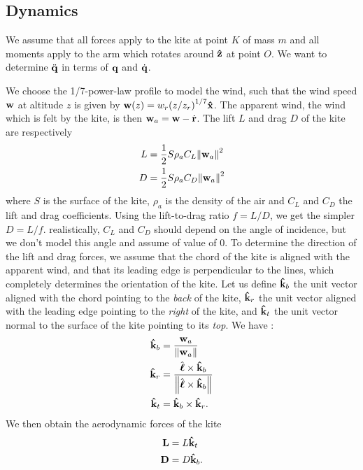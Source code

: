 \subsection{Dynamics}  \label{sec:model10D-dynamics}

We assume that all forces apply to the kite at point $K$ of mass $m$ and all moments apply to the arm which rotates around $\vu z$ at point $O$.
We want to determine $\ddot{\vb q}$ in terms of $\vb q$ and $\dot{\vb q}$.

\label{sec:model10D-dyn-aero}

We choose the 1/7-power-law profile to model the wind, such that the wind speed $\vb w$ at altitude $z$ is given by $\vb w(z) = w_r \qty( z / z_r )^{1/7} \vu x$.
The apparent wind, the wind which is felt by the kite, is then $\vb w_a = \vb w - \dot{\vb r}$.
The lift $L$ and drag $D$ of the kite are respectively
\begin{align}
    L &= \frac{1}{2} S \rho_a C_L \norm{\vb w_a}^2 \\
    D &= \frac{1}{2} S \rho_a C_D \norm{\vb w_a}^2
\end{align}
%
where $S$ is the surface of the kite, $\rho_a$ is the density of the air and $C_L$ and $C_D$ the lift and drag coefficients.
Using the lift-to-drag ratio $f = L / D$, we get the simpler $D = L/f$.
realistically, $C_L$ and $C_D$ should depend on the angle of incidence, but we don't model this angle and assume of value of $0$.
To determine the direction of the lift and drag forces, we assume that the chord of the kite is aligned with the apparent wind, and that its leading edge is perpendicular to the lines, which completely determines the orientation of the kite.
Let us define $\vu k_b$ the unit vector aligned with the chord pointing to the \emph{back} of the kite, $\vu k_r$ the unit vector aligned with the leading edge pointing to the \emph{right} of the kite, and $\vu k_t$ the unit vector normal to the surface of the kite pointing to its \emph{top}.
We have :
\begin{align}
    \vu k_b &= \frac{\vb w_a }{\norm{\vb w_a}} \\
    \vu k_r &= \frac{\hat{\boldsymbol{\ell}} \times \vu k_b}{\norm{\hat{\boldsymbol{\ell}} \times \vu k_b}} \\
    \vu k_t &= \vu k_b \times \vu k_r.
\end{align}
We then obtain the aerodynamic forces of the kite
\begin{align}
    \vb L &= L \vu k_t \\
    \vb D &= D \vu k_b.
\end{align}

